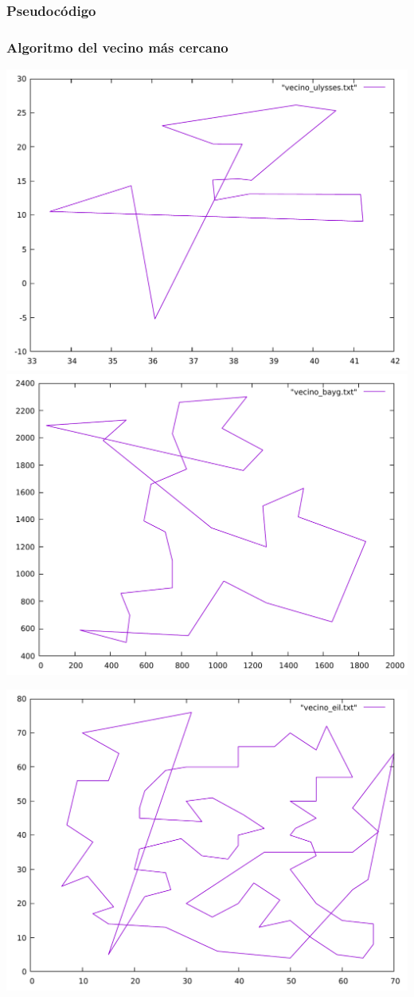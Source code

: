 \documentclass[13pt]{beamer}
\begin{document}
	\begin{frame}
		\frametitle{Pseudocódigo}

	\end{frame}

	\begin{frame}
		\frametitle{Algoritmo del vecino más cercano}
			\includegraphics[scale=0.2]{../src/vecino_ulysses.pdf}
			\includegraphics[scale=0.2]{../src/vecino_bayg.pdf}
			\begin{center}
				\includegraphics[scale=0.2]{../src/vecino_eil.pdf}

\end{center}
\end{frame}
\end{document}
